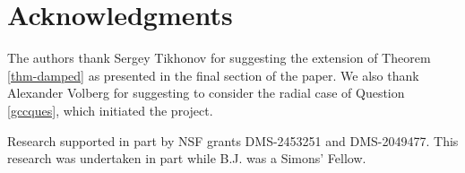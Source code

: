 \documentclass[11pt,a4paper,reqno,dvipsnames]{amsart}
\numberwithin{equation}{section}
\theoremstyle{plain}
\theoremstyle{definition}
\theoremstyle{remark}
\begin{document}
\section*{Acknowledgments}
The authors thank Sergey Tikhonov for suggesting the extension of Theorem \ref{thm-damped} as presented in the final section of the paper.  We also thank Alexander Volberg for suggesting to consider the radial case of Question \ref{gccques}, which initiated the project.

Research supported in part by NSF grants DMS-2453251 and DMS-2049477.  This research was undertaken in part while B.J. was a Simons’ Fellow.


\nocite{*}

\end{document}

